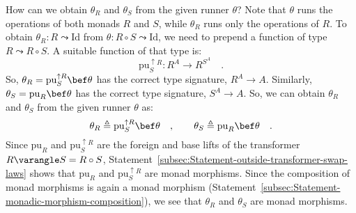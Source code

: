 How can we obtain $\theta_{R}$ and $\theta_{S}$ from the given runner
$\theta$? Note that $\theta$ runs the operations of both monads
$R$ and $S$, while $\theta_{R}$ runs only the operations of $R$.
To obtain $\theta_{R}:R\leadsto\text{Id}$ from $\theta:R\circ S\leadsto\text{Id}$,
we need to prepend a function of type $R\leadsto R\circ S$. A suitable
function of that type is:
\[
\text{pu}_{S}^{\uparrow R}:R^{A}\rightarrow R^{S^{A}}\quad.
\]
So, $\theta_{R}=\text{pu}_{S}^{\uparrow R}\bef\theta$ has the correct
type signature, $R^{A}\rightarrow A$. Similarly, $\theta_{S}=\text{pu}_{R}\bef\theta$
has the correct type signature, $S^{A}\rightarrow A$. So, we can
obtain $\theta_{R}$ and $\theta_{S}$ from the given runner $\theta$
as:
\[
\theta_{R}\triangleq\text{pu}_{S}^{\uparrow R}\bef\theta\quad,\quad\quad\theta_{S}\triangleq\text{pu}_{R}\bef\theta\quad.
\]
Since $\text{pu}_{R}$ and $\text{pu}_{S}^{\uparrow R}$ are the foreign
and base lifts of the transformer $R\varangle S=R\circ S$, Statement~\ref{subsec:Statement-outside-transformer-swap-laws}
shows that $\text{pu}_{R}$ and $\text{pu}_{S}^{\uparrow R}$ are
monad morphisms. Since the composition of monad morphisms is again
a monad morphism (Statement~\ref{subsec:Statement-monadic-morphism-composition}),
we see that $\theta_{R}$ and $\theta_{S}$ are monad morphisms.


